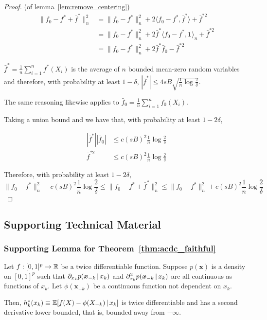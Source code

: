 \begin{proof} (of lemma~\ref{lem:remove_centering})
\begin{align*}
\| f_0 - f^* + \bar{f}^* \|_n^2 &= \| f_0 - f^* \|_n^2 
    + 2 \langle f_0 - f^*, \bar{f}^* \rangle + \bar{f}^{*2} \\
  &= \| f_0 - f^* \|_n^2 + 2 \bar{f}^* \langle f_0 - f^*, \mathbf{1} \rangle_n + 
    \bar{f}^{*2} \\
  &= \| f_0 - f^* \|_n^2 + 2 \bar{f}^* \bar{f}_0 - \bar{f}^{*2}
\end{align*}


$\bar{f}^* = \frac{1}{n} \sum_{i=1}^n f^*(X_i)$ is the average of $n$ bounded mean-zero random variables and therefore, with probability at least $1-\delta$, $| \bar{f}^* | \leq 4 sB \sqrt{ \frac{1}{n} \log \frac{2}{\delta} }$.

The same reasoning likewise applies to $\bar{f}_0 = \frac{1}{n} \sum_{i=1}^n f_0(X_i)$.

Taking a union bound and we have that, with probability at least $1- 2\delta$, 

\begin{align*}
| \bar{f}^* | | \bar{f}_0 | &\leq c (sB)^2 \frac{1}{n} \log \frac{2}{\delta} \\
\bar{f}^{*2} &\leq c (sB)^2 \frac{1}{n} \log \frac{2}{\delta}
\end{align*}

Therefore, with probability at least $1 - 2\delta$,
\[
\|f_0 - f^*\|_n^2 - c (sB)^2 \frac{1}{n} \log \frac{2}{\delta} \leq
    \| f_0 - f^* + \bar{f}^* \|_n^2 \leq 
\|f_0 - f^*\|_n^2 + c (sB)^2 \frac{1}{n} \log \frac{2}{\delta}
\]

\end{proof}





 \subsection{Supporting Technical Material}
 
\subsubsection{Supporting Lemma for Theorem~\ref{thm:acdc_faithful}}

\begin{lemma}
\label{lem:acdc_derivative_bound}
Let $f : [0,1]^p \rightarrow {\mathbb R}$ be a twice differentiable function. Suppose $p(\mathbf{x})$ is a density on $[0,1]^p$ such that $\partial_{x_k} p(\mbox{\boldmath $x$}_{-k} {\,|\,} x_k)$ and $\partial_{x_k}^2 p(\mbox{\boldmath $x$}_{-k} {\,|\,} x_k)$ are all continuous as functions of $x_k$. Let $\phi(\mathbf{x}_{-k})$ be a continuous function not dependent on $x_k$.

Then, $h^*_k(x_k) \equiv {\mathbb E}[ f(X) - \phi(X_{-k}) {\,|\,} x_k]$ is twice differentiable and has a second derivative lower bounded, that is, bounded away from $-\infty$.
\end{lemma}


